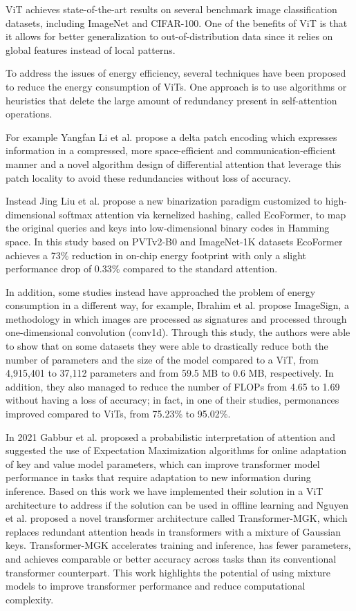 ViT achieves state-of-the-art results on several benchmark image classification datasets, including ImageNet and CIFAR-100. One of the benefits of ViT is that it allows for better generalization to out-of-distribution data since it relies on global features instead of local patterns.


To address the issues of energy efficiency, several techniques have been proposed to reduce the energy consumption of ViTs. One approach is to use algorithms or heuristics that delete the large amount of redundancy present in self-attention operations. 

For example Yangfan Li et al.\cite{li2022divit} propose a delta patch encoding which expresses information in a compressed, more space-efficient and communication-efficient manner and a novel algorithm design of differential attention that leverage this patch locality to avoid these redundancies without loss of accuracy. 

Instead Jing Liu et al. \cite{liu2022ecoformer} propose a new binarization paradigm customized to high-dimensional
softmax attention via kernelized hashing, called EcoFormer, to map the original queries and keys into low-dimensional binary codes in Hamming space. In this study based on PVTv2-B0 and
ImageNet-1K datasets EcoFormer achieves a 73\% reduction in on-chip energy footprint with only a slight performance drop of 0.33\% compared to the standard attention.

In addition, some studies instead have approached the problem of energy consumption in a different way, for example, Ibrahim et al. \cite{ibrahim2022imagesig} propose ImageSign, a methodology in which images are processed as signatures and processed through one-dimensional convolution (conv1d). Through this study, the authors were able to show that on some datasets they were able to drastically reduce both the number of parameters and the size of the model compared to a ViT, from 4,915,401 to 37,112 parameters and from 59.5 MB to 0.6 MB, respectively. In addition, they also managed to reduce the number of FLOPs from 4.65 to 1.69 without having a loss of accuracy; in fact, in one of their studies, permonances improved compared to ViTs, from 75.23\% to 95.02\%.

In 2021 Gabbur et al. \cite{DBLP:journals/corr/abs-2010-15583} proposed a probabilistic interpretation of attention and suggested the use of Expectation Maximization algorithms for online adaptation of key and value model parameters, which can improve transformer model performance in tasks that require adaptation to new information during inference. Based on this work we have implemented their solution in a ViT architecture to address if the solution can be used in offline learning and  Nguyen et al. \cite{DBLP:journals/corr/abs-2110-08678,} proposed a novel transformer architecture called Transformer-MGK, which replaces redundant attention heads in transformers with a mixture of Gaussian keys. Transformer-MGK accelerates training and inference, has fewer parameters, and achieves comparable or better accuracy across tasks than its conventional transformer counterpart. This work highlights the potential of using mixture models to improve transformer performance and reduce computational complexity.

